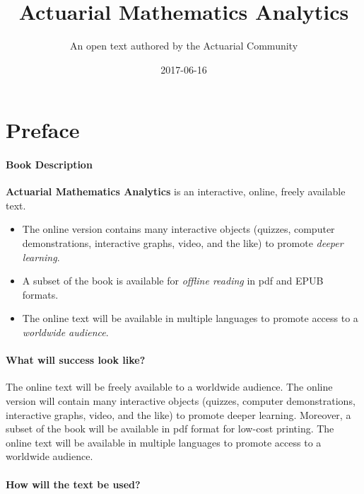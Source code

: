 \documentclass[]{book}
\title{Actuarial Mathematics Analytics}
\author{An open text authored by the Actuarial Community}
\date{2017-06-16}
\begin{document}
\maketitle

{
\setcounter{tocdepth}{2}
\tableofcontents
}
\chapter*{Preface}\label{preface}

\subsubsection*{Book Description}\label{book-description}

\textbf{Actuarial Mathematics Analytics} is an interactive, online,
freely available text.

\begin{itemize}
\item
  The online version contains many interactive objects (quizzes,
  computer demonstrations, interactive graphs, video, and the like) to
  promote \emph{deeper learning}.
\item
  A subset of the book is available for \emph{offline reading} in pdf
  and EPUB formats.
\item
  The online text will be available in multiple languages to promote
  access to a \emph{worldwide audience}.
\end{itemize}

\subsubsection*{What will success look
like?}\label{what-will-success-look-like}

The online text will be freely available to a worldwide audience. The
online version will contain many interactive objects (quizzes, computer
demonstrations, interactive graphs, video, and the like) to promote
deeper learning. Moreover, a subset of the book will be available in pdf
format for low-cost printing. The online text will be available in
multiple languages to promote access to a worldwide audience.

\subsubsection*{How will the text be
used?}\label{how-will-the-text-be-used}
\end{document}
